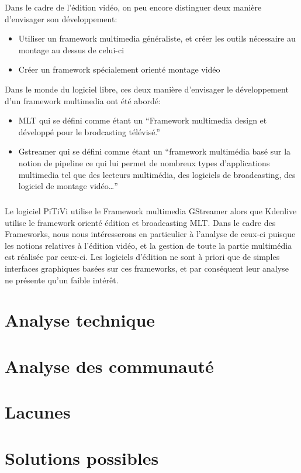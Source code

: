 Dans le cadre de l'édition vidéo, on peu encore distinguer deux manière
d'envisager son développement:

\begin {itemize}

  \item {Utiliser un framework multimedia généraliste, et créer les
  outils nécessaire
         au montage au dessus de celui-ci} %

  \item {Créer un framework spécialement orienté montage vidéo}

\end {itemize}

Dans le monde du logiciel libre, ces deux manière d'envisager le
développement d'un framework multimedia ont été abordé:

\begin {itemize}

  \item {MLT qui se défini comme étant un ``Framework multimedia design
    et développé pour le brodcasting télévisé.''}

  \item {Gstreamer qui se défini comme étant un ``framework multimédia
    basé sur la notion de pipeline ce qui lui permet de nombreux types
    d'applications multimedia tel que des lecteurs multimédia, des
    logiciels de broadcasting, des logiciel de montage vidéo\ldots''}

\end {itemize}

\subparagraph {}

Le logiciel PiTiVi utilise le Framework multimedia GStreamer alors que
Kdenlive utilise le framework orienté édition et
broadcasting MLT. Dans le cadre des Frameworks, nous nous intéresserons
en particulier à l'analyse de ceux-ci puisque les notions relatives
à l'édition vidéo, et la gestion de toute la partie multimédia est
réalisée par ceux-ci. Les logiciels d'édition ne sont à priori que
de simples interfaces graphiques basées sur ces frameworks, et par
conséquent leur analyse ne présente qu'un faible intérêt.

\section{Analyse technique}

\section{Analyse des communauté}

\section{Lacunes}

\section{Solutions possibles}
